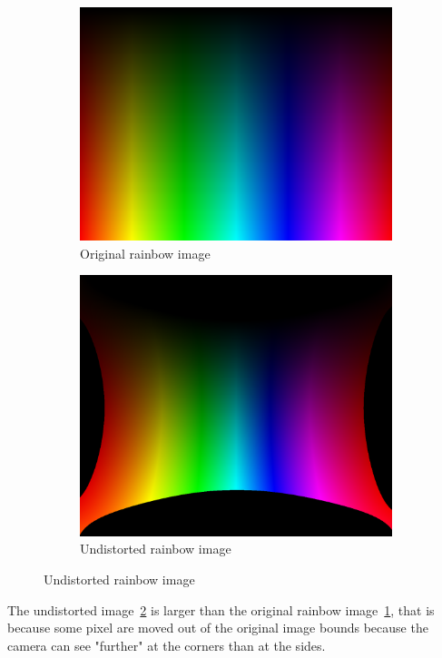 \begin{figure}[H]
    \centering
    \begin{subfigure}{.5\textwidth}
        \centering
        \includegraphics[width=.8\textwidth]{../photos/original_rainbow}
        \caption[originalRainbow]{Original rainbow image}
        \label{fig:original_rainbow}
    \end{subfigure}%
    \begin{subfigure}{.5\textwidth}
        \centering
        \includegraphics[width=.8\textwidth]{../photos/undistorted_rainbow}
        \caption[originalRainbow]{Undistorted rainbow image}
        \label{fig:undistorted_rainbow}
    \end{subfigure}
    \caption{Undistorted rainbow image}
    \label{fig:original_undistorted_rainbow}
\end{figure}
The undistorted image~\ref{fig:undistorted_rainbow} is larger than the original rainbow image~\ref{fig:original_rainbow}, that is because some pixel are moved out of the original image bounds because the camera can see "further" at the corners than at the sides.
